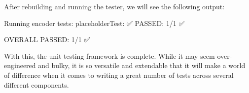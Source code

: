 After rebuilding and running the tester, we will see the following output:

\begin{stdout}
Running encoder tests:
  placeholderTest: ✅
PASSED: 1/1 ✅

OVERALL PASSED: 1/1 ✅
\end{stdout}

With this, the unit testing framework is complete. While it may seem over-engineered and bulky, it is so versatile and extendable that it will make a world of difference when it comes to writing a great number of tests across several different components.